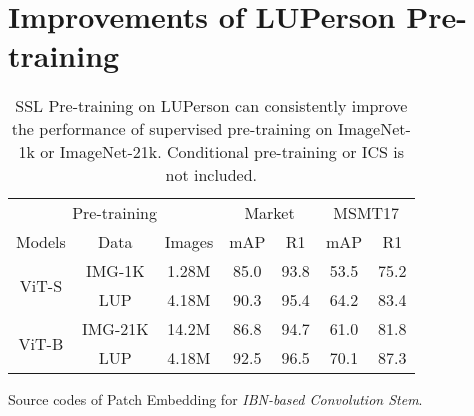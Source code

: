 \documentclass[10pt,twocolumn,letterpaper]{article}
\begin{document}
\section{Improvements of LUPerson Pre-training}
\vspace{-0.5em}
\renewcommand{\multirowsetup}{\centering}
\begin{table}[htb]\small
    \begin{center}
    \setlength\tabcolsep{5pt}
    \begin{tabular}{ccc|cc|cc}
    \hline
     \multicolumn{3}{c|}{Pre-training}  & \multicolumn{2}{c|}{Market}  & \multicolumn{2}{c}{MSMT17}\\
    Models &Data & Images & mAP & R1 & mAP & R1\\
    \hline
    \multirow{2}{*}{ViT-S}& IMG-1K &1.28M &85.0 &93.8 &53.5 &75.2\\
                          &LUP & 4.18M &90.3 &95.4 &64.2 &83.4\\
    \hline
    \multirow{2}{*}{ViT-B}& IMG-21K &14.2M &86.8 &94.7 &61.0 &81.8\\
                          &LUP & 4.18M &92.5 &96.5 &70.1 &87.3\\
    \hline
    \end{tabular}
    \end{center}
    \vspace{-1em}
    \caption{\label{tab:ssl2} SSL Pre-training on LUPerson can consistently improve the performance of supervised pre-training on ImageNet-1k or ImageNet-21k. Conditional pre-training or ICS is not included.}
    \vspace{-2em}
\end{table}

\onecolumn
\begin{algorithm*}
\caption{Source codes of Patch Embedding for \textit{IBN-based Convolution Stem}.}\label{ics}

\end{algorithm*}
\end{document}
